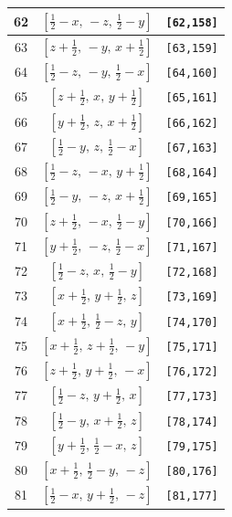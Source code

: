 \documentclass[fleqn,8pt]{jsarticle}
\begin{document}
\begin{longtable}{ccc}
62 & $\left[ \frac{1}{2} - x,\, - z,\, \frac{1}{2} - y \right]$ & {\tt [62,158]} \\ \hline
63 & $\left[ z + \frac{1}{2},\, - y,\, x + \frac{1}{2} \right]$ & {\tt [63,159]} \\ \hline
64 & $\left[ \frac{1}{2} - z,\, - y,\, \frac{1}{2} - x \right]$ & {\tt [64,160]} \\ \hline
65 & $\left[ z + \frac{1}{2},\, x,\, y + \frac{1}{2} \right]$ & {\tt [65,161]} \\ \hline
66 & $\left[ y + \frac{1}{2},\, z,\, x + \frac{1}{2} \right]$ & {\tt [66,162]} \\ \hline
67 & $\left[ \frac{1}{2} - y,\, z,\, \frac{1}{2} - x \right]$ & {\tt [67,163]} \\ \hline
68 & $\left[ \frac{1}{2} - z,\, - x,\, y + \frac{1}{2} \right]$ & {\tt [68,164]} \\ \hline
69 & $\left[ \frac{1}{2} - y,\, - z,\, x + \frac{1}{2} \right]$ & {\tt [69,165]} \\ \hline
70 & $\left[ z + \frac{1}{2},\, - x,\, \frac{1}{2} - y \right]$ & {\tt [70,166]} \\ \hline
71 & $\left[ y + \frac{1}{2},\, - z,\, \frac{1}{2} - x \right]$ & {\tt [71,167]} \\ \hline
72 & $\left[ \frac{1}{2} - z,\, x,\, \frac{1}{2} - y \right]$ & {\tt [72,168]} \\ \hline
73 & $\left[ x + \frac{1}{2},\, y + \frac{1}{2},\, z \right]$ & {\tt [73,169]} \\ \hline
74 & $\left[ x + \frac{1}{2},\, \frac{1}{2} - z,\, y \right]$ & {\tt [74,170]} \\ \hline
75 & $\left[ x + \frac{1}{2},\, z + \frac{1}{2},\, - y \right]$ & {\tt [75,171]} \\ \hline
76 & $\left[ z + \frac{1}{2},\, y + \frac{1}{2},\, - x \right]$ & {\tt [76,172]} \\ \hline
77 & $\left[ \frac{1}{2} - z,\, y + \frac{1}{2},\, x \right]$ & {\tt [77,173]} \\ \hline
78 & $\left[ \frac{1}{2} - y,\, x + \frac{1}{2},\, z \right]$ & {\tt [78,174]} \\ \hline
79 & $\left[ y + \frac{1}{2},\, \frac{1}{2} - x,\, z \right]$ & {\tt [79,175]} \\ \hline
80 & $\left[ x + \frac{1}{2},\, \frac{1}{2} - y,\, - z \right]$ & {\tt [80,176]} \\ \hline
81 & $\left[ \frac{1}{2} - x,\, y + \frac{1}{2},\, - z \right]$ & {\tt [81,177]} \\ \hline

\end{longtable}
\end{document}
